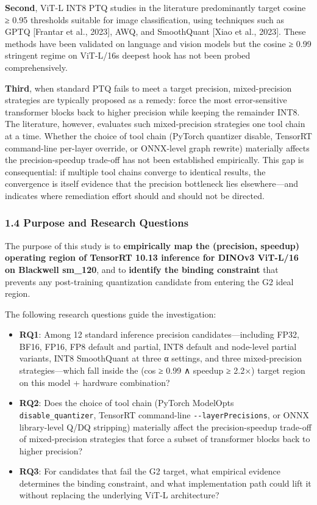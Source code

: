 \documentclass[
]{article}
\begin{document}
\textbf{Second}, ViT-L INT8 PTQ studies in the literature predominantly
target cosine ≥ 0.95 thresholds suitable for image classification, using
techniques such as GPTQ {[}Frantar et al., 2023{]}, AWQ, and SmoothQuant
{[}Xiao et al., 2023{]}. These methods have been validated on language
and vision models but the cosine ≥ 0.99 stringent regime on
ViT-L/16\textquotesingle s deepest hook has not been probed
comprehensively.

\textbf{Third}, when standard PTQ fails to meet a target precision,
mixed-precision strategies are typically proposed as a remedy: force the
most error-sensitive transformer blocks back to higher precision while
keeping the remainder INT8. The literature, however, evaluates such
mixed-precision strategies one tool chain at a time. Whether the choice
of tool chain (PyTorch quantizer disable, TensorRT command-line
per-layer override, or ONNX-level graph rewrite) materially affects the
precision-speedup trade-off has not been established empirically. This
gap is consequential: if multiple tool chains converge to identical
results, the convergence is itself evidence that the precision
bottleneck lies elsewhere---and indicates where remediation effort
should and should not be directed.

\subsubsection{1.4 Purpose and Research
Questions}\label{14-purpose-and-research-questions}

The purpose of this study is to \textbf{empirically map the (precision,
speedup) operating region of TensorRT 10.13 inference for DINOv3
ViT-L/16 on Blackwell sm\_120}, and to \textbf{identify the binding
constraint} that prevents any post-training quantization candidate from
entering the G2 ideal region.

The following research questions guide the investigation:

\begin{itemize}
\item
  \textbf{RQ1}: Among 12 standard inference precision
  candidates---including FP32, BF16, FP16, FP8 default and partial, INT8
  default and node-level partial variants, INT8 SmoothQuant at three α
  settings, and three mixed-precision strategies---which fall inside the
  (cos ≥ 0.99 ∧ speedup ≥ 2.2×) target region on this model + hardware
  combination?
\item
  \textbf{RQ2}: Does the choice of tool chain (PyTorch
  ModelOpt\textquotesingle s \texttt{disable\_quantizer}, TensorRT
  command-line \texttt{-\/-layerPrecisions}, or ONNX library-level Q/DQ
  stripping) materially affect the precision-speedup trade-off of
  mixed-precision strategies that force a subset of transformer blocks
  back to higher precision?
\item
  \textbf{RQ3}: For candidates that fail the G2 target, what empirical
  evidence determines the binding constraint, and what implementation
  path could lift it without replacing the underlying ViT-L
  architecture?
\end{itemize}
\end{document}
